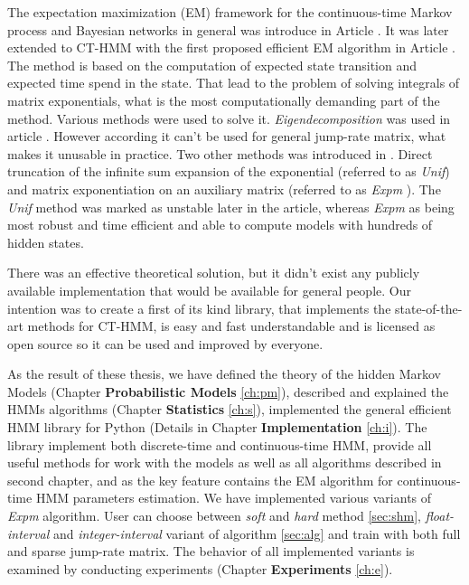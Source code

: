 \documentclass[thesis=M,english]{FITthesis}[2012/10/20]
\begin{document}
\begin{introduction}
The expectation maximization (EM) framework for the continuous-time Markov process and Bayesian networks in general was introduce in Article \cite{No12}. It was later extended to CT-HMM with the first proposed efficient EM algorithm in Article \cite{Li15}. The method is based on the computation of expected state transition and expected time spend in the state. That lead to the problem of solving integrals of matrix exponentials, what is the most computationally demanding part of the method. Various methods were used to solve it. \textit{Eigendecomposition} was used in article \cite{Wa14}. However according \cite{Li15} it can't be used for general jump-rate matrix, what makes it unusable in practice. Two other methods was introduced in \cite{Li15}. Direct truncation of the infinite sum expansion of the exponential (referred to as \textit{Unif}) and matrix exponentiation on an auxiliary matrix (referred to as \textit{Expm} ). The \textit{Unif} method was marked as unstable later in the article, whereas \textit{Expm} as being most robust and time efficient and able to compute models with hundreds of hidden states.      

There was an effective theoretical solution, but it didn't exist any publicly available implementation that would be available for general people. Our intention was to create a first of its kind library, that implements the state-of-the-art methods for CT-HMM, is easy and fast understandable and is licensed as open source so it can be used and improved by everyone. 

As the result of these thesis, we have defined the theory of the hidden Markov Models (Chapter \textbf{Probabilistic Models} \ref{ch:pm}), described and explained the HMMs algorithms (Chapter \textbf{Statistics} \ref{ch:s}), implemented the general efficient HMM library for Python (Details in Chapter \textbf{Implementation} \ref{ch:i}). The library implement both discrete-time and continuous-time HMM, provide all useful methods for work with the models as well as all algorithms described in second chapter, and as the key feature contains the EM algorithm for continuous-time HMM parameters estimation. We have implemented various variants of \textit{Expm} algorithm. User can choose between \textit{soft} and \textit{hard} method \ref{sec:shm}, \textit{float-interval} and \textit{integer-interval} variant of algorithm \ref{sec:alg} and train with both full and sparse jump-rate matrix. The behavior of all implemented variants is examined by conducting  experiments (Chapter \textbf{Experiments} \ref{ch:e}).      
 	
\end{introduction}
\end{document}
